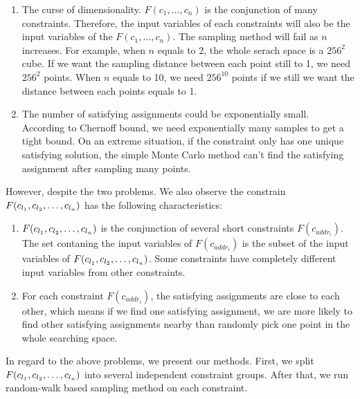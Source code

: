 \begin{enumerate}
      \item The curse of dimensionality. $F(c_1,\ldots,c_n)$ is the conjunction of many
      constraints. Therefore, the input variables of each constraints will also be 
      the input variables of the  $F(c_1,\ldots,c_n)$. The sampling method will fail as 
      $n$ increases. For example, when $n$ equals to 2, the whole serach space is 
      a $256^2$ cube. If we want the sampling distance between each point still to 1,
      we need $256^2$ points. When $n$ equals to 10, we need $256^{10}$ points if we 
      still we want the distance between each points equals to 1. 

      \item The number of satisfying assignments could be exponentially small.
      According to Chernoff bound, we need exponentially many samples to get 
      a tight bound. On an extreme situation, if the constraint only has one unique
      satisfying solution, the simple Monte Carlo method can't find the satisfying
      assignment after sampling many points.
\end{enumerate}

However, despite the two problems. We also observe the constrain $F(c_{l_{1}},c_{l_{2}},\ldots,c_{l_{n}})$
has the following characteristics:
\begin{enumerate}
      \item $F(c_{l_{1}},c_{l_{2}},\ldots,c_{l_{n}})$ is the conjunction of several
      short constraints $F(c_{{addr}_i})$. The set contaning the input variables of 
      $F(c_{{addr}_i})$ is the subset of the input variables of $F(c_{l_{1}},c_{l_{2}},\ldots,c_{l_{n}})$.
      Some constraints have completely different input variables from other constraints.
      \item For each constraint $F(c_{{addr}_i})$, the satisfying assignments
      are close to each other, which means if we find one satisfying assignment, we 
      are more likely to find other satisfying assignments nearby than randomly
      pick one point in the whole searching space.
      
\end{enumerate}

In regard to the above problems, we present our methods. First, we split 
$F(c_{l_{1}},c_{l_{2}},\ldots,c_{l_{n}})$ into several independent constraint groups. After
that, we run random-walk based sampling method on each constraint.

